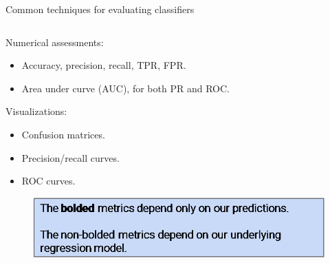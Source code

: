 \documentclass[aspectratio=169]{../latex_main/tntbeamer}  %
\begin{document}
	
	\begin{frame}{Common techniques for evaluating classifiers}
	    \begin{columns}
	        \begin{column}{.5\textwidth}
	            Numerical assessments:
	             \begin{itemize}
	                 \item Accuracy, precision, recall, TPR, FPR.
	                 \item Area under curve (AUC), for both PR and ROC.
	             \end{itemize}
	             Visualizations:
	             \begin{itemize}
	                 \item Confusion matrices.
	                 \item Precision/recall curves.
	                 \item ROC curves.
	             \end{itemize}
	             \begin{figure}
	                    \centering
	                    \includegraphics[scale=.5]{Bild32}
	                \end{figure}
	        \end{column}
	        

\end{columns}
\end{frame}
\end{document}
